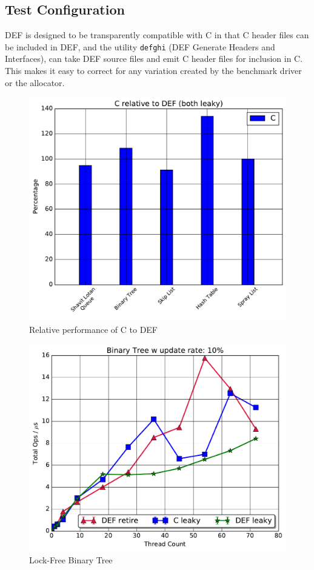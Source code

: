 \subsection{Test Configuration}

DEF is designed to be transparently compatible with C in that C header files can be included in DEF, and the utility \texttt{defghi} (DEF Generate Headers and Interfaces), can take DEF source files and emit C header files for inclusion in C.  This makes it easy to correct for any variation created by the benchmark driver or the allocator.



\begin{figure}
\includegraphics[scale=0.4]{gfx/relativeperf.pdf}
\caption{Relative performance of C to DEF}
\end{figure}
\begin{figure}
\includegraphics[scale=.4]{gfx/BinaryTreeLight.pdf}
\caption{Lock-Free Binary Tree}
\end{figure}

